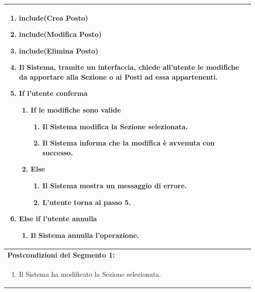 \documentclass{article}
\begin{document}
\begin{table}[H]
\begin{tabular}{|p{\linewidth}|}
\begin{enumerate}
                            \item \textbf{include}(Crea Posto)
                            \item \textbf{include}(Modifica Posto)
                            \item \textbf{include}(Elimina Posto)
                            \item Il Sistema, tramite un interfaccia, chiede all'utente le modifiche da apportare alla Sezione o ai Posti ad essa appartenenti.
                            \item \textbf{If} l'utente conferma
                            \begin{enumerate}
                                \item \textbf{If} le modifiche sono valide
                                \begin{enumerate}
                                    \item Il Sistema modifica la Sezione selezionata.
                                    \item Il Sistema informa che la modifica è avvenuta con successo.
                                \end{enumerate}
                                \item \textbf{Else}
                                \begin{enumerate}
                                    \item Il Sistema mostra un messaggio di errore.
                                    \item L'utente torna al passo 5.
                                \end{enumerate}
                            \end{enumerate}
                            \item \textbf{Else if} l'utente annulla
                            \begin{enumerate}
                                \item Il Sistema annulla l'operazione.
                            \end{enumerate}
                        \end{enumerate} \\
                        \hline
                        \cellcolor{gray!20}
                        \textbf{Postcondizioni del Segmento 1:} \\
                        \cellcolor{gray!20}
                        \begin{minipage}{\linewidth}
                            \begin{enumerate}
                                \item Il Sistema ha modificato la Sezione selezionata.
                            \end{enumerate}
                        \end{minipage} \\
                        \hline
                    \end{tabular}
                \end{table}
\end{document}
